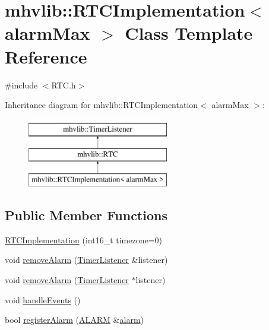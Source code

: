 \hypertarget{classmhvlib_1_1_r_t_c_implementation}{\section{mhvlib\-:\-:R\-T\-C\-Implementation$<$ alarm\-Max $>$ Class Template Reference}
\label{classmhvlib_1_1_r_t_c_implementation}
}


{\ttfamily \#include $<$R\-T\-C.\-h$>$}

Inheritance diagram for mhvlib\-:\-:R\-T\-C\-Implementation$<$ alarm\-Max $>$\-:\begin{figure}[H]
\begin{center}
\leavevmode
\includegraphics[height=3.000000cm]{classmhvlib_1_1_r_t_c_implementation}
\end{center}
\end{figure}
\subsection*{Public Member Functions}
\begin{DoxyCompactItemize}
\item 
\hyperlink{classmhvlib_1_1_r_t_c_implementation_a488b77a84eda12a3d7c77b1564548546}{R\-T\-C\-Implementation} (int16\-\_\-t timezone=0)
\item 
void \hyperlink{classmhvlib_1_1_r_t_c_implementation_a9227ec78a3483ef7a55b475f476de7cb}{remove\-Alarm} (\hyperlink{classmhvlib_1_1_timer_listener}{Timer\-Listener} \&listener)
\item 
void \hyperlink{classmhvlib_1_1_r_t_c_implementation_ad6b7e1094069e809648818bafc83fa1d}{remove\-Alarm} (\hyperlink{classmhvlib_1_1_timer_listener}{Timer\-Listener} $\ast$listener)
\item 
void \hyperlink{classmhvlib_1_1_r_t_c_implementation_ada5160b3ee34cdd7614bc55915c4643b}{handle\-Events} ()
\item 
bool \hyperlink{classmhvlib_1_1_r_t_c_implementation_a5f90324cfffabcb857d65be1e2b1f254}{register\-Alarm} (\hyperlink{namespacemhvlib_a3fa96bbaa152dfe112dd50663d5caef5}{A\-L\-A\-R\-M} \&\hyperlink{structmhvlib_1_1alarm}{alarm})
\end{DoxyCompactItemize}
